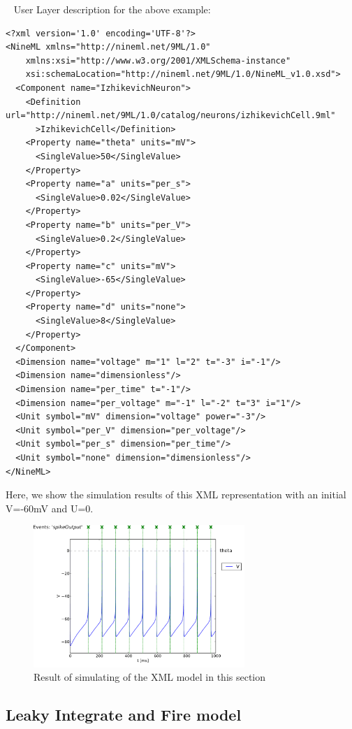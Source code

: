 \documentclass[draftspec]{ninemlspec}
\begin{document}
~
User Layer description for the above example:

\begin{lstlisting}[style=XML]
<?xml version='1.0' encoding='UTF-8'?>
<NineML xmlns="http://nineml.net/9ML/1.0"
    xmlns:xsi="http://www.w3.org/2001/XMLSchema-instance"
    xsi:schemaLocation="http://nineml.net/9ML/1.0/NineML_v1.0.xsd">
  <Component name="IzhikevichNeuron">
    <Definition url="http://nineml.net/9ML/1.0/catalog/neurons/izhikevichCell.9ml"
      >IzhikevichCell</Definition>
    <Property name="theta" units="mV">
      <SingleValue>50</SingleValue>
    </Property>
    <Property name="a" units="per_s">
      <SingleValue>0.02</SingleValue>
    </Property>
    <Property name="b" units="per_V">
      <SingleValue>0.2</SingleValue>
    </Property>
    <Property name="c" units="mV">
      <SingleValue>-65</SingleValue>
    </Property>
    <Property name="d" units="none">
      <SingleValue>8</SingleValue>
    </Property>
  </Component>
  <Dimension name="voltage" m="1" l="2" t="-3" i="-1"/>
  <Dimension name="dimensionless"/>
  <Dimension name="per_time" t="-1"/>
  <Dimension name="per_voltage" m="-1" l="-2" t="3" i="1"/>  
  <Unit symbol="mV" dimension="voltage" power="-3"/>
  <Unit symbol="per_V" dimension="per_voltage"/>
  <Unit symbol="per_s" dimension="per_time"/>
  <Unit symbol="none" dimension="dimensionless"/>  
</NineML>
\end{lstlisting}

Here, we show the simulation results of this XML representation with an initial V=-60mV and U=0.
\begin{figure}[htb!]
\center
\includegraphics[width=8cm]{figures/example_IzVoltageWave.pdf}
\protect\caption{Result of simulating of the XML model in
this section}
\label{fig:Ex1_Output}
\end{figure}

\subsection{Leaky Integrate and Fire model}
\end{document}

